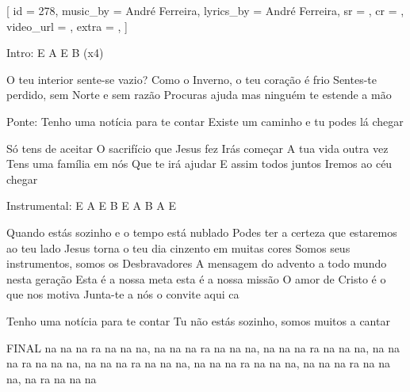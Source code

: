 
[
    id          = {278},
    music_by    = {André Ferreira},
    lyrics_by   = {André Ferreira},
    sr          = {},
    cr          = {},
    video_url   = {},
    extra       = {},
]

\beginverse
Intro: E A E B (x4)
\endverse

\beginverse
O teu interior sente-se vazio? 
Como o Inverno, o teu coração é frio  
Sentes-te perdido, sem Norte e sem razão
Procuras ajuda mas ninguém te estende a mão
\endverse


\beginverse
Ponte:
Tenho uma notícia para te contar
Existe um caminho e tu podes lá chegar
\endverse

\beginchorus
Só tens de aceitar
O sacrifício que Jesus fez
Irás começar
A tua vida outra vez
Tens uma família em nós
Que te irá ajudar
E assim todos juntos 
Iremos ao céu chegar
\endchorus

\beginverse
Instrumental: E A E B E A B A E
\endverse


\beginverse
Quando estás sozinho e o tempo está nublado
Podes ter a certeza que estaremos ao teu lado
Jesus torna o teu dia cinzento em muitas cores
Somos seus instrumentos, somos os Desbravadores
A mensagem do advento a todo mundo nesta geração 
Esta é a nossa meta esta é a nossa missão
O amor de Cristo é o que nos motiva 
Junta-te a nós o convite aqui  ca
\endverse

\beginverse
Tenho uma notícia para te contar
Tu não estás sozinho, somos muitos a cantar
\endverse

\beginverse
FINAL
na na na ra na na na, na na na ra na na na, 
na na na ra na na na, na na na ra na na na, 
na na na ra na na na, na na na ra na na na, 
na na na ra na na na, na ra na na na
\endverse

\endsong
